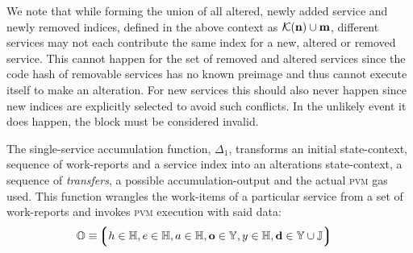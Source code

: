 We note that while forming the union of all altered, newly added service and newly removed indices, defined in the above context as $\mathcal{K}(\mathbf{n}) \cup \mathbf{m}$, different services may not each contribute the same index for a new, altered or removed service. This cannot happen for the set of removed and altered services since the code hash of removable services has no known preimage and thus cannot execute itself to make an alteration. For new services this should also never happen since new indices are explicitly selected to avoid such conflicts. In the unlikely event it does happen, the block must be considered invalid.

The single-service accumulation function, $\Delta_1$, transforms an initial state-context, sequence of work-reports and a service index into an alterations state-context, a sequence of \emph{transfers}, a possible accumulation-output and the actual \textsc{pvm} gas used. This function wrangles the work-items of a particular service from a set of work-reports and invokes \textsc{pvm} execution with said data:
\begin{align}
  &\mathbb{O} \equiv \tuple{
    \isa{h}{\H},
    \isa{e}{\H},
    \isa{a}{\H},
    \isa{\mathbf{o}}{\Y},
    \isa{y}{\H},
    \isa{\mathbf{d}}{\Y \cup \mathbb{J}}
  }
\end{align}

